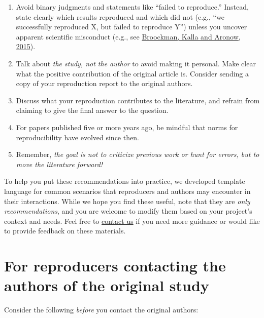 \documentclass[
  openany]{book}
\providecommand{\tightlist}{%
  \setlength{\itemsep}{0pt}\setlength{\parskip}{0pt}}
\begin{document}
\begin{enumerate}
\def\labelenumi{\alph{enumi}.}
\tightlist
\item
  Avoid binary judgments and statements like ``failed to reproduce.'' Instead, state clearly which results reproduced and which did not (e.g., ``we successfully reproduced X, but failed to reproduce Y'') unless you uncover apparent scientific misconduct (e.g., see \href{https://doi.org/10.31222/osf.io/qy2se}{Broockman, Kalla and Aronow, 2015}).\\
\item
  Talk about \emph{the study, not the author} to avoid making it personal. Make clear what the positive contribution of the original article is. Consider sending a copy of your reproduction report to the original authors.\\
\item
  Discuss what your reproduction contributes to the literature, and refrain from claiming to give the final answer to the question.\\
\item
  For papers published five or more years ago, be mindful that norms for reproducibility have evolved since then.\\
\item
  Remember, \emph{the goal is not to criticize previous work or hunt for errors, but to move the literature forward!}
\end{enumerate}

To help you put these recommendations into practice, we developed template language for common scenarios that reproducers and authors may encounter in their interactions. While we hope you find these useful, note that they are \emph{only recommendations}, and you are welcome to modify them based on your project's context and needs. Feel free to \href{mailto:acre@berkeley.edu}{contact us} if you need more guidance or would like to provide feedback on these materials.

\hypertarget{for-reproducers-contacting-the-authors-of-the-original-study}{%
\section{For reproducers contacting the authors of the original study}\label{for-reproducers-contacting-the-authors-of-the-original-study}}

Consider the following \emph{before} you contact the original authors:
\end{document}
